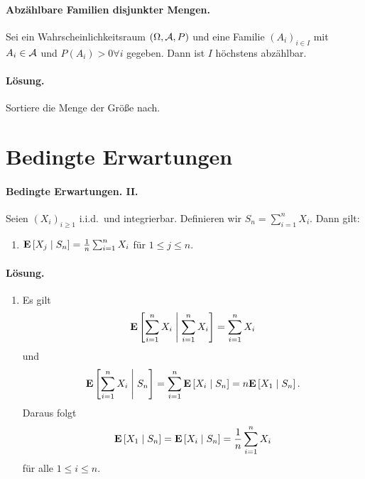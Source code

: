 \paragraph{Abzählbare Familien disjunkter Mengen.} Sei ein Wahrscheinlichkeitsraum
$(\Omega, \mathcal A, P)$ und eine Familie $(A_i)_{i\in I}$ mit $A_i \in \mathcal A$ und
$P(A_i)>0 \forall i$ gegeben. Dann ist $I$ höchstens abzählbar. 
\paragraph*{Lösung.} Sortiere die Menge der Größe nach. 



\section{Bedingte Erwartungen}



\paragraph{Bedingte Erwartungen. II.}
Seien $\left( X_i \right)_{i\geq 1}$ i.i.d.\ und integrierbar. Definieren wir 
$S_n = \sum_{i=1}^{n} X_i$. Dann gilt:
\begin{enumerate}
    \item $\mathbf{E} \left[ X_j \;\middle\vert\; S_n \right] = \frac{1}{n} \sum_{i=1}^{n} X_i$
        für $1\leq j \leq n$.
\end{enumerate}

\paragraph*{Lösung.} 
\begin{enumerate}
    \item Es gilt
        \begin{equation*}
            \mathbf{E} \left[ \sum_{i=1}^{n} X_i \;\middle\vert\; \sum_{i=1}^{n} X_i \right] 
            = \sum_{i=1}^{n} X_i
        \end{equation*}
        und
        \begin{equation*}
            \mathbf{E} \left[  \sum_{i=1}^{n} X_i \;\middle\vert\; S_n \right] =
            \sum_{i=1}^{n} \mathbf{E} \left[ X_i \;\middle\vert\; S_n \right] = 
            n \mathbf{E} \left[ X_1 \;\middle\vert\; S_n \right].
        \end{equation*}
        Daraus folgt
        \begin{equation*}
             \mathbf{E} \left[ X_1 \;\middle\vert\; S_n \right] = \mathbf{E} \left[ X_i \;\middle\vert\; S_n \right] =
             \frac{1}{n} \sum_{i=1}^{n} X_i
        \end{equation*}
        für alle $1 \leq i \leq n$. 
\end{enumerate}


